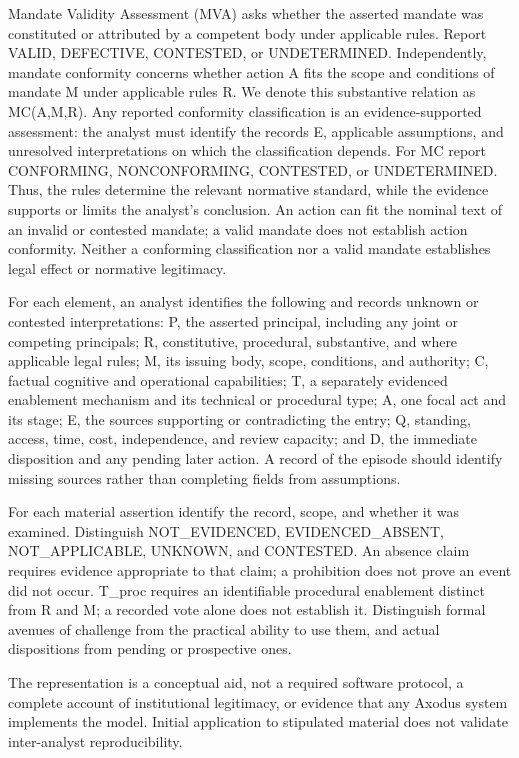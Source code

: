 \documentclass[
  10pt,
]{article}
\begin{document}
Mandate Validity Assessment (MVA) asks whether the asserted mandate was
constituted or attributed by a competent body under applicable rules.
Report VALID, DEFECTIVE, CONTESTED, or UNDETERMINED. Independently,
mandate conformity concerns whether action A fits the scope and
conditions of mandate M under applicable rules R. We denote this
substantive relation as MC(A,M,R). Any reported conformity
classification is an evidence-supported assessment: the analyst must
identify the records E, applicable assumptions, and unresolved
interpretations on which the classification depends. For MC report
CONFORMING, NONCONFORMING, CONTESTED, or UNDETERMINED. Thus, the rules
determine the relevant normative standard, while the evidence supports
or limits the analyst's conclusion. An action can fit the nominal text
of an invalid or contested mandate; a valid mandate does not establish
action conformity. Neither a conforming classification nor a valid
mandate establishes legal effect or normative legitimacy.

For each element, an analyst identifies the following and records
unknown or contested interpretations: P, the asserted principal,
including any joint or competing principals; R, constitutive,
procedural, substantive, and where applicable legal rules; M, its
issuing body, scope, conditions, and authority; C, factual cognitive and
operational capabilities; T, a separately evidenced enablement mechanism
and its technical or procedural type; A, one focal act and its stage; E,
the sources supporting or contradicting the entry; Q, standing, access,
time, cost, independence, and review capacity; and D, the immediate
disposition and any pending later action. A record of the episode should
identify missing sources rather than completing fields from assumptions.

For each material assertion identify the record, scope, and whether it
was examined. Distinguish NOT\_EVIDENCED, EVIDENCED\_ABSENT,
NOT\_APPLICABLE, UNKNOWN, and CONTESTED. An absence claim requires
evidence appropriate to that claim; a prohibition does not prove an
event did not occur. T\_proc requires an identifiable procedural
enablement distinct from R and M; a recorded vote alone does not
establish it. Distinguish formal avenues of challenge from the practical
ability to use them, and actual dispositions from pending or prospective
ones.

The representation is a conceptual aid, not a required software
protocol, a complete account of institutional legitimacy, or evidence
that any Axodus system implements the model. Initial application to
stipulated material does not validate inter-analyst reproducibility.
\end{document}
